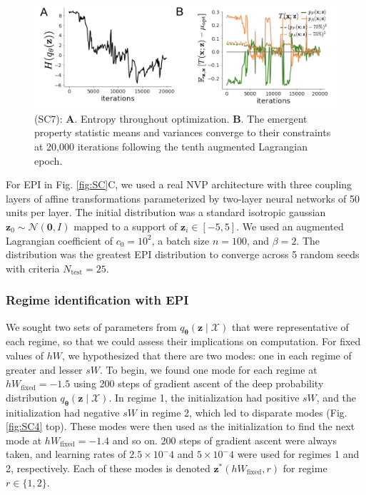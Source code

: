 \documentclass[11pt]{article}
\begin{document}
\begin{figure}
\begin{center}
\includegraphics[scale=0.5]{figures/figSC7/figSC7.pdf}
\end{center}
\caption{\small (SC7): 
\textbf{A}. Entropy throughout optimization. 
\textbf{B}. The emergent property statistic means and variances converge to their constraints at 20,000 iterations following the tenth augmented Lagrangian epoch.
}
\label{fig:SC7}
\end{figure}

For EPI in Fig. \ref{fig:SC}C, we used a real NVP architecture with three coupling layers of affine transformations parameterized by two-layer neural networks of 50 units per layer.
The initial distribution was a standard isotropic gaussian $\mathbf{z}_0 \sim \mathcal{N}(\mathbf{0}, I)$ mapped to a support of $\mathbf{z}_i \in [-5, 5]$. 
We used an augmented Lagrangian coefficient of $c_0 = 10^{2}$, a batch size $n=100$, and $\beta=2$.
The distribution was the greatest EPI distribution to converge across 5 random seeds with criteria $N_{\text{test}} = 25$.

\subsubsection{Regime identification with EPI} \label{methods_sc_regime}
We sought two sets of parameters from $q_{\bm{\theta}}(\mathbf{z} \mid \mathcal{X})$ that were representative of each regime, so that we could assess their implications on computation.
For fixed values of $hW$, we hypothesized that there are two modes: one in each regime of greater and lesser $sW$.
To begin, we found one mode for each regime at $hW_{\text{fixed}} = -1.5$ using 200 steps of gradient ascent of the deep probability distribution $q_{\bm{\theta}}(\mathbf{z} \mid \mathcal{X})$.
In regime 1, the initialization had positive $sW$, and the initialization had negative $sW$ in regime 2, which led to disparate modes (Fig. \ref{fig:SC4} top).
These modes were then used as the initialization to find the next mode at $hW_{\text{fixed}} = -1.4$ and so on.
200 steps of gradient ascent were always taken, and learning rates of $2.5 \times 10^-4$ and $5 \times 10^-4$ were used for regimes 1 and 2, respectively.
Each of these modes is denoted $\mathbf{z}^*(hW_{\text{fixed}}, r)$ for regime $r \in \{1, 2\}$.
\end{document}

